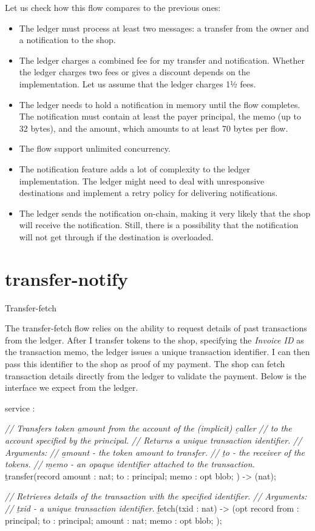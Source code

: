 \documentclass{article}
\begin{document}
Let us check how this flow compares to the previous ones:
\begin{itemize}
  \item The ledger must process at least two messages: a transfer from the owner and a notification to the shop.
  \item 
    The ledger charges a combined fee for my transfer and notification.
    Whether the ledger charges two fees or gives a discount depends on the implementation.
    Let us assume that the ledger charges 1½ fees.
  \item 
    The ledger needs to hold a notification in memory until the flow completes.
    The notification must contain at least the payer principal, the memo (up to 32 bytes), and the amount, which amounts to at least 70 bytes per flow.
  \item The flow support unlimited concurrency.
  \item 
    The notification feature adds a lot of complexity to the ledger implementation.
    The ledger might need to deal with unresponsive destinations and implement a retry policy for delivering notifications.
  \item 
    The ledger sends the notification on-chain, making it very likely that the shop will receive the notification.
    Still, there is a possibility that the notification will not get through if the destination is overloaded.
\end{itemize}

\section{transfer-notify}{Transfer-fetch}

The transfer-fetch flow relies on the ability to request details of past transactions from the ledger.
After I transfer tokens to the shop, specifying the \emph{Invoice ID} as the transaction memo, the ledger issues a unique transaction identifier.
I can then pass this identifier to the shop as proof of my payment.
The shop can fetch transaction details directly from the ledger to validate the payment.
Below is the interface we expect from the ledger.

\begin{code}[candid]
service : {
  \emph{// Transfers token \b{amount} from the account of the (implicit) \b{caller}}
  \emph{// to the account specified by the principal.}
  \emph{// Returns a unique transaction identifier.}
  \emph{// Arguments:}
  \emph{//   \b{amount} - the token amount to transfer.}
  \emph{//   \b{to} - the receiver of the tokens.}
  \emph{//   \b{memo} - an opaque identifier attached to the transaction.}
  \b{transfer}(record {
    amount : nat;
    to : principal;
    memo : opt blob;
  }) -> (nat);

  \emph{// Retrieves details of the transaction with the specified identifier.}
  \emph{// Arguments:}
  \emph{//   \b{txid} - a unique transaction identifier.}
  \b{fetch}(txid : nat) -> (opt record {
    from : principal;
    to : principal;
    amount : nat;
    memo : opt blob;
  });
}
\end{code}
\end{document}
